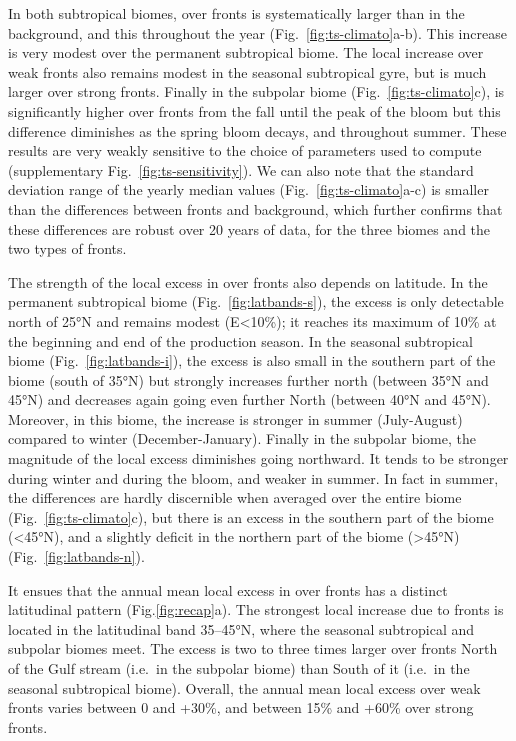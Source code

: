 In both subtropical biomes,  over fronts is systematically larger than in the background, and this throughout the year (Fig.~\ref{fig:ts-climato}a-b).
This increase is very modest over the permanent subtropical biome.
The local increase over weak fronts also remains modest in the seasonal subtropical gyre, but is much larger over strong fronts.
Finally in the subpolar biome (Fig.~\ref{fig:ts-climato}c),  is significantly higher over fronts from the fall until the peak of the bloom but this difference diminishes as the spring bloom decays, and throughout summer.
These results are very weakly sensitive to the choice of parameters used to compute  (supplementary Fig.~\ref{fig:ts-sensitivity}).
We can also note that the standard deviation range of the yearly median values (Fig.~\ref{fig:ts-climato}a-c) is smaller than the differences between fronts and background, which further confirms that these differences are robust over 20 years of data, for the three biomes and the two types of fronts.

The strength of the local excess in  over fronts also depends on latitude.
In the permanent subtropical biome (Fig.~\ref{fig:latbands-s}), the excess is only detectable north of 25°N and remains modest (E<10\%); it reaches its maximum of 10\% at the beginning and end of the production season.
In the seasonal subtropical biome (Fig.~\ref{fig:latbands-i}), the excess is also small in the southern part of the biome (south of 35°N) but strongly increases further north (between 35°N and 45°N) and decreases again going even further North (between 40°N and 45°N).
Moreover, in this biome, the increase is stronger in summer (July-August) compared to winter (December-January).
Finally in the subpolar biome, the magnitude of the local excess diminishes going northward.
It tends to be stronger during winter and during the bloom, and weaker in summer.
In fact in summer, the differences are hardly discernible when averaged over the entire biome (Fig.~\ref{fig:ts-climato}c), but there is an excess  in the southern part of the biome (\textless45°N), and a slightly deficit in the northern part of the biome (\textgreater45°N) (Fig.~\ref{fig:latbands-n}).

It ensues that the annual mean local excess in  over fronts has a distinct latitudinal pattern (Fig.\ref{fig:recap}a).
The strongest local increase due to fronts is located in the latitudinal band 35--45°N, where the seasonal subtropical and subpolar biomes meet.
The excess is two to three times larger over fronts North of the Gulf stream (i.e.\ in the subpolar biome) than South of it (i.e.\ in the seasonal subtropical biome).
Overall, the annual mean local excess over weak fronts varies between 0 and +30\%, and between 15\% and +60\% over strong fronts.



